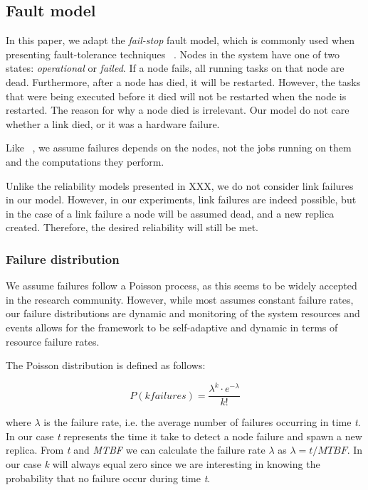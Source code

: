 \documentclass{cslthse-msc}
\begin{document}
\subsection{Fault model} \label{subsec:design_fault_model}
In this paper, we adapt the \emph{fail-stop} fault model, which is commonly used when presenting fault-tolerance techniques ~\cite{surveyFaultParallel}. Nodes in the system have one of two states: \emph{operational} or \emph{failed}. If a node fails, all running tasks on that node are dead. Furthermore, after a node has died, it will be restarted. However, the tasks that were being executed before it died will not be restarted when the node is restarted. The reason for why a node died is irrelevant. Our model do not care whether a link died, or it was a hardware failure. 

Like ~\cite{selfAdaptRel}, we assume failures depends on the nodes, not the jobs running on them and the computations they perform.

Unlike the reliability models presented in XXX, we do not consider link failures in our model. However, in our experiments, link failures are indeed possible, but in the case of a link failure a node will be assumed dead, and a new replica created. Therefore, the desired reliability will still be met. %

\subsubsection{Failure distribution}
We assume failures follow a Poisson process, as this seems to be widely accepted in the research community. However, while most assumes constant failure rates, our failure distributions are dynamic and monitoring of the system resources and events allows for the framework to be self-adaptive and dynamic in terms of resource failure rates.

The Poisson distribution is defined as follows:

\begin{equation} \label{eq:Poisson}
P(k failures) = \dfrac{\lambda^k \cdot e^{-\lambda}}{k!}
\end{equation}

where $\lambda$ is the failure rate, i.e. the average number of failures occurring in time \emph{t}. In our case \emph{t} represents the time it take to detect a node failure and spawn a new replica. From \emph{t} and \emph{MTBF} we can calculate the failure rate $\lambda$ as $\lambda = t/MTBF$. In our case \emph{k} will always equal zero since we are interesting in knowing the probability that no failure occur during time \emph{t}. 
\end{document}
